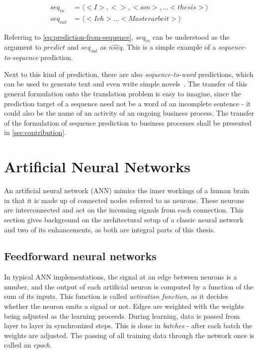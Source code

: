 \begin{equation*}
\begin{split}
seq_{in} &= \langle<I>, < >, <am>, ... <thesis>\rangle\\
seq_{out} &= \langle<Ich> ... <Masterarbeit>\rangle
\end{split}
\end{equation*}

Referring to \autoref{eq:prediction-from-sequence}, $seq_{in}$ can be understood as the argument to $predict$ and $seq_{out}$ as $\widehat{nseq}$. This is a simple example of a \textit{sequence-to-sequence} prediction.

Next to this kind of prediction, there are also \textit{sequence-to-word} predictions, which can be used to generate text and even write simple novels~\cite{web:text-generation-machinelearningmastery, web:text-generation-freecodecamp}. The transfer of this general formulation onto the translation problem is easy to imagine, since the prediction target of a sequence need not be a word of an incomplete sentence - it could also be the name of an activity of an ongoing business process. The transfer of the formulation of sequence prediction to business processes shall be presented in \autoref{sec:contribution}.

\section{Artificial Neural Networks}
An artificial neural network (ANN) mimics the inner workings of a human brain in that it is made up of connected nodes referred to as neurons. These neurons are interconnected and act on the incoming signals from each connection. This section gives background on the architectural setup of a classic neural network and two of its enhancements, as both are integral parts of this thesis.

\subsection{Feedforward neural networks}
In typical ANN implementations, the signal at an edge between neurons is a number, and the output of each artificial neuron is computed by a function of the sum of its inputs. This function is called \textit{activation function}, as it decides whether the neuron emits a signal or not. Edges are weighted with the weights being adjusted as the learning proceeds. During learning, data is passed from layer to layer in synchronized steps. This is done in \textit{batches} - after each batch the weights are adjusted. The passing of all training data through the network once is called an \textit{epoch}.

